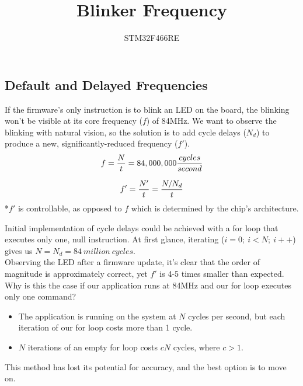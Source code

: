 \documentclass[a4paper,12pt]{article}   	%
\title{Blinker Frequency}
\author{STM32F466RE}
\begin{document}
\maketitle

\subsection*{Default and Delayed Frequencies}
\large
If the firmware's only instruction is to blink an LED on the board,
the blinking won't be visible at its core 
frequency ($f$) of 84MHz. We want to observe the blinking 
with natural vision, so the solution 
is to add cycle delays ($N_d$) to produce a new, 
significantly-reduced frequency ($f'$).\\[1 ex]

$$f = \frac{N}{t} = 84,000,000 \frac{cycles}{second}\\[3 ex]$$

$$f' = \frac{N'}{t} = \frac{N/N_d}{t}\\[3 ex]$$
\large
\normalsize
*$f'$ is controllable, as opposed to $f$ which is determined by the chip's architecture.\\[1 ex]

\large
\begin{flushleft}
Initial implementation of cycle delays could be achieved
with a 
for loop that executes only one, null instruction. At first 
glance, iterating ($i = 0;\ i < N;\ i++$)
gives us $N = N_d = 84\ million\ cycles$.\\[1 ex]

Observing the LED after a firmware update, it's clear that the order of magnitude is approximately correct, 
yet $f'$ is 4-5 times smaller than expected. Why is this the case 
if our application runs at 84MHz and our for loop executes only one command?\\[1 ex]

\end{flushleft}
\begin{itemize}
\setlength{\itemindent}{0.4in}
    \item The application is running on the system at $N$ cycles per second, 
    but each iteration of our for loop 
    costs more than 1 cycle. 
    \item $N$ iterations of an empty for loop costs $cN$ cycles, where $c > 1$.
\end{itemize}



\begin{flushleft}
    This method has lost its potential for accuracy, and the best option is to move on.

\end{flushleft}
\end{document}
